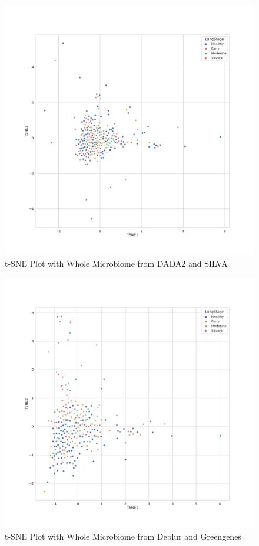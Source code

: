 \documentclass[a4paper]{article}
\begin{document}
            \begin{figure}[p]
                \centering
                \includegraphics[width=0.6 \linewidth]{figures/tSNE/Whole/whole.DADA2.silva.png}
                \caption{t-SNE Plot with Whole Microbiome from DADA2 and SILVA}
                \label{fig:tsne-whole-dada2-silva}
            \end{figure}

            \begin{figure}[p]
                \centering
                \includegraphics[width=0.6 \linewidth]{figures/tSNE/Whole/whole.Deblur.gg.png}
                \caption{t-SNE Plot with Whole Microbiome from Deblur and Greengenes}
                \label{fig:tsne-whole-deblur-gg}
            \end{figure}
\end{document}
